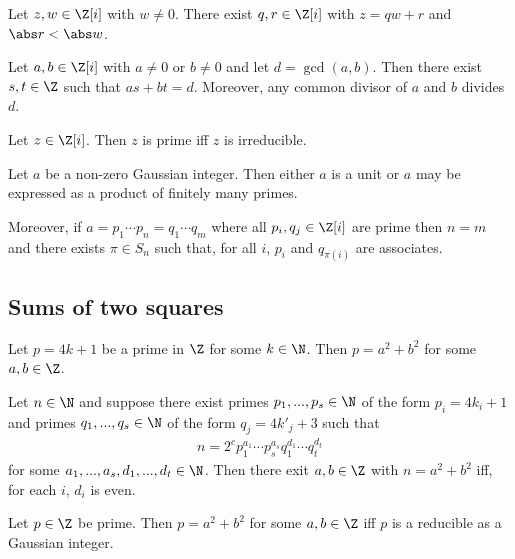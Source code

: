 \documentclass{article}
\begin{document}
\begin{theorem}
	Let $z,w\in\Z[i]$ with $w\not=0$. There exist $q,r\in\Z[i]$ with $z=qw+r$ and $\abs r<\abs w$.
\end{theorem}

\begin{theorem}
	Let $a,b\in\Z[i]$ with $a\not=0$ or $b\not=0$ and let $d=\gcd(a,b)$. Then there exist $s,t\in\Z$
	such that $as+bt=d$. Moreover, any common divisor of $a$ and $b$ divides $d$.
\end{theorem}

\begin{theorem}[Lectures 15-16]
	Let $z\in\Z[i]$. Then $z$ is prime iff $z$ is irreducible.
\end{theorem}

\begin{theorem}
	Let $a$ be a non-zero Gaussian integer. Then either $a$ is a unit or $a$ may be expressed 
	as a product of finitely many primes.

	Moreover, if $a=p_1\cdots p_n=q_1\cdots q_m$ where all $p_i,q_j\in\Z[i]$ are prime then 
	$n=m$ and there exists $\pi\in S_n$ such that, for all $i$, $p_i$ and $q_{\pi(i)}$ are associates.
\end{theorem}

\subsection{Sums of two squares}

\begin{theorem}[Lectures 15-16]
	Let $p=4k+1$ be a prime in $\Z$ for some $k\in\N$. Then $p=a^2+b^2$ for some 
	$a,b\in\Z$.
\end{theorem}

\begin{theorem}[Lectures 15-16]
	Let $n\in\N$ and suppose there exist primes $p_1,...,p_s\in\N$ of the form 
	$p_i=4k_i+1$ and primes $q_1,...,q_s\in\N$ of the form $q_j=4k'_j+3$ such that 
	\begin{align*}
		n=2^c p_1^{a_1}\cdots p_s^{a_s} q_1^{d_1}\cdots q_t^{d_t}
	\end{align*}
	for some $a_1,...,a_s,d_1,...,d_t\in\N$. Then there exit $a,b\in\Z$ with 
	$n=a^2+b^2$ iff, for each $i$, $d_i$ is even.
\end{theorem}

\begin{lemma}[Lectures 15-16]
	Let $p\in\Z$ be prime. Then $p=a^2+b^2$ for some $a,b\in\Z$ iff $p$ is a reducible 
	as a Gaussian integer.	
\end{lemma}
\end{document}
